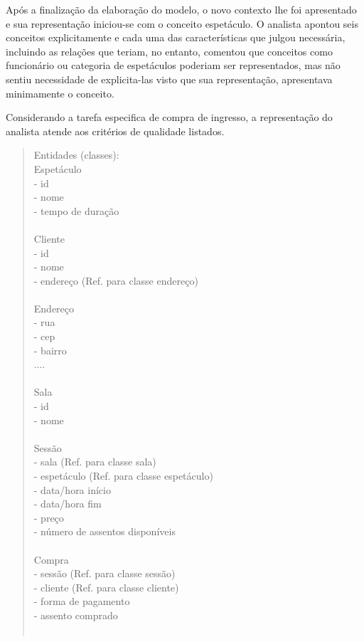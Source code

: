 Após a finalização da elaboração do modelo, o novo contexto lhe foi apresentado e sua representação iniciou-se com o conceito espetáculo. O analista apontou seis conceitos explicitamente e cada uma das características que julgou necessária, incluindo as relações que teriam, no entanto, comentou que conceitos como funcionário ou categoria de espetáculos poderiam ser representados, mas não sentiu necessidade de explicita-las visto que sua representação, apresentava minimamente o conceito.  

Considerando a tarefa especifica de compra de ingresso, a representação do analista atende aos critérios de qualidade listados. 

\begin{quote}
Entidades (classes):\\
Espetáculo {\\
    - id\\
    - nome\\
    - tempo de duração\\
}\\
Cliente {\\
    - id\\
    - nome\\
    - endereço (Ref. para classe endereço)\\
}\\
Endereço {\\
    - rua\\
    - cep\\
    - bairro\\
     ....\\
}\\
Sala {\\
    - id\\
    - nome\\
}\\
Sessão {\\
    - sala (Ref. para classe sala)\\
    - espetáculo (Ref. para classe espetáculo)\\
    - data/hora início\\
    - data/hora fim\\
    - preço\\
    - número de assentos disponíveis\\
}\\
Compra {\\
    - sessão (Ref. para classe sessão)\\
    - cliente (Ref. para classe cliente)\\
    - forma de pagamento\\
    - assento comprado\\
}\\
\end{quote}

